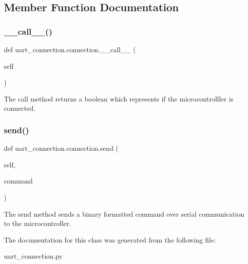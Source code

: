 \subsection{Member Function Documentation}
\mbox{\label{classuart__connection_1_1connection_a9b7b9013cd1371f6d3e72f09b7073932}} 
\subsubsection{\texorpdfstring{\+\_\+\+\_\+call\+\_\+\+\_\+()}{\_\_call\_\_()}}
{\footnotesize\ttfamily def uart\+\_\+connection.\+connection.\+\_\+\+\_\+call\+\_\+\+\_\+ (\begin{DoxyParamCaption}\item[{}]{self }\end{DoxyParamCaption})}



The call method returns a boolean which represents if the microcontrolller is connected. 

\mbox{\label{classuart__connection_1_1connection_adf7f182c05b3864beb0b72b987b2ada2}} 
\subsubsection{\texorpdfstring{send()}{send()}}
{\footnotesize\ttfamily def uart\+\_\+connection.\+connection.\+send (\begin{DoxyParamCaption}\item[{}]{self,  }\item[{}]{command }\end{DoxyParamCaption})}



The send method sends a binary formatted command over serial communication to the microcontroller. 



The documentation for this class was generated from the following file\+:\begin{DoxyCompactItemize}
\item 
uart\+\_\+connection.\+py\end{DoxyCompactItemize}
